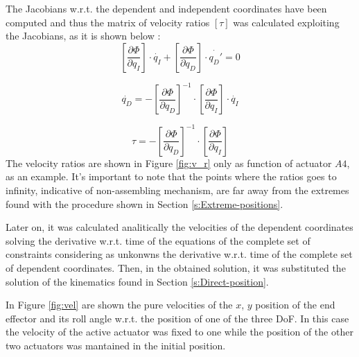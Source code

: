 \documentclass[10.5pt, twocolumn]{article}
\begin{document}
The Jacobians w.r.t. the dependent and independent coordinates have been computed and thus the matrix of velocity ratios \([ \tau ]\) was calculated exploiting the Jacobians, as it is shown below \cite{Biral}:
  \begin{equation}
    \left[\frac{\partial \Phi }{\partial q_I}\right] \cdot \dot{q_I} + \left[\frac{\partial \Phi }{\partial q_D}\right] \cdot \dot{q_D'} = 0
  \end{equation}

  \begin{equation}
    \dot{q_D} = -\left[\frac{\partial \Phi }{\partial q_D}\right]^{-1} \cdot \left[\frac{\partial \Phi }{\partial q_I}\right] \cdot \dot{q_I}
  \end{equation}

  \begin{equation}
    \tau = - \left[\frac{\partial \Phi }{\partial q_D}\right]^{-1} \cdot \left[\frac{\partial \Phi }{\partial q_I}\right]
  \end{equation}
The velocity ratios are shown in Figure \ref{fig:v_r} only as function of actuator \(A4\), as an example. It's important to note that the points where the ratios goes to infinity, indicative of non-assembling mechanism, are far away from the extremes found with the procedure shown in Section \ref{s:Extreme-positions}.

Later on, it was calculated analitically the velocities of the dependent coordinates solving the derivative w.r.t. time of the equations of the complete set of constraints considering as unkonwns the derivative w.r.t. time of the complete set of dependent coordinates. Then, in the obtained solution, it was substituted the solution of the kinematics found in Section \ref{s:Direct-position}.

In Figure \ref{fig:vel} are shown the pure velocities of the \( x \), \( y \) position of the end effector and its roll angle w.r.t. the position of one of the three DoF. In this case the velocity of the active actuator was fixed to one while the position of the other two actuators was mantained in the initial position.
\end{document}
